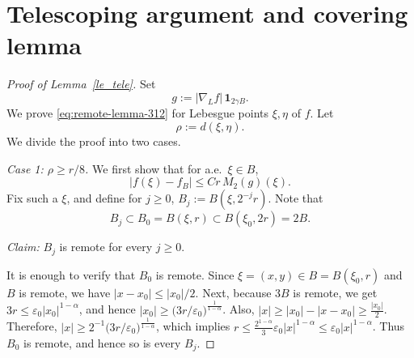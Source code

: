 \documentclass[12pt]{amsart}
\begin{document}
\appendix


\section{Telescoping argument and covering lemma}\label{app:tele}



\begin{proof}[Proof of Lemma~\ref{le_tele}]
Set 
\[
g:=|\nabla_L f|\,\mathbf{1}_{2\gamma B}.
\]
We prove \eqref{eq:remote-lemma-312} for Lebesgue points $\xi,\eta$ of $f$.
Let
\[
\rho:=d(\xi,\eta).
\]
We divide the proof into two cases.

\textit{Case 1: $\rho\ge r/8$.}
We first show that for a.e.\ $\xi \in B$,
\begin{equation}\label{eq:point-vs-ball}
|f(\xi)-f_B|\le C r\, M_2(g)(\xi).
\end{equation}
Fix such a $\xi$, and define for $j\ge0$, $B_j:=B(\xi,2^{-j}r)$. Note that
\begin{equation*}
    B_j \subset B_0 = B(\xi,r) \subset B(\xi_0, 2r) = 2B.
\end{equation*}

\textit{Claim:} $B_j$ is remote for every $j\ge 0$.

It is enough to verify that $B_0$ is remote. Since $\xi = (x,y) \in B=B(\xi_0,r)$ and $B$ is remote, we have $|x-x_0|\le |x_0|/2$. Next, because $3B$ is remote, we get $3r \le \varepsilon_0 |x_0|^{1-\alpha}$, and hence $|x_0|\ge \bigl(3r/\varepsilon_0\bigr)^{\frac{1}{1-\alpha}}$. Also, $|x|\ge |x_0|- |x-x_0|\ge \frac{|x_0|}{2}$. Therefore, $|x|\ge 2^{-1} \bigl(3r/\varepsilon_0\bigr)^{\frac{1}{1-\alpha}}$, which implies $r \le \frac{2^{1-\alpha}}{3} \varepsilon_0 |x|^{1-\alpha} \le \varepsilon_0 |x|^{1-\alpha}$. Thus $B_0$ is remote, and hence so is every $B_j$.


\end{proof}
\end{document}
